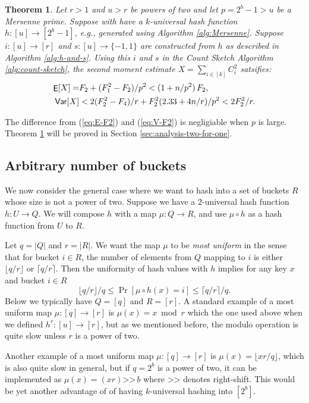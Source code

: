 \documentclass[12pt]{article}
\DeclareMathOperator*{\E}{\sf{E}}
\newcommand{\Var}{{\sf Var}}
\newcommand{\floor}[1]{\lfloor {#1} \rfloor}
\newcommand{\req}[1]{(\ref{#1})}
\newtheorem {theorem}[lemma] {Theorem}
\newcommand\fct\rightarrow
\newcommand\ceil[1]{\lceil {#1}\rceil}
\begin{document}
\begin{theorem}\label{thm:h-and-s-p}
Let $r>1$ and $u>r$ be powers of two and let $p=2^b-1>u$ be a
Mersenne prime.
Suppose with have a $k$-universal hash function $h:[u]\fct[2^b-1]$, e.g.,
generated using Algorithm \ref{alg:Mersenne}. Suppose
$i:[u]\fct[r]$ and
$s:[u]\fct\{-1,1\}$ are constructed from $h$ as described in
Algorithm \ref{alg:h-and-s}. Using this $i$ and $s$ 
in the Count Sketch Algorithm \ref{alg:count-sketch}, the second moment 
estimate $X=\sum_{i\in[k]} C_i^2$ satsifies:
\begin{align}
\E[X]=&F_2+(F_1^2-F_2)/p^2 < (1+n/p^2)\,F_2\textnormal,\label{eq:E-F2-p}\\
\Var[X]&< 2(F_2^2-F_4)/r+F_2^2 (2.33+4 n/r)/p^2<2F_2^2/r.\label{eq:V-F2-p}
\end{align}
\end{theorem}
The difference from \req{eq:E-F2} and \req{eq:V-F2} 
is negligiable when $p$ is large. Theorem \ref{thm:h-and-s-p} will be
proved in Section \ref{sec:analysis-two-for-one}.


\subsection{Arbitrary number of buckets}\label{sec:most-uniform}
We now consider the general case where we want to hash into a set of
buckets $R$ whose size is not a power of two. Suppose we have a
$2$-universal hash function $h:U\fct Q$. We will compose $h$ with a
map $\mu:Q\fct R$, and use $\mu\circ h$ as a hash function from
$U$ to $R$.

Let $q=|Q|$ and $r=|R|$. We want the map $\mu$ to be \emph{most
  uniform} in the sense that for bucket $i\in R$, the number of
elements from $Q$ mapping to $i$ is either $\floor{q/r}$ or
$\ceil{q/r}$. Then the uniformity of hash values with $h$ implies for
any key $x$ and bucket $i\in R$
\[\floor{q/r}/q\leq \Pr[\mu\circ
  h(x)=i]\leq \ceil{q/r}/q.\]
Below we typically have $Q=[q]$ and $R=[r]$. A standard example of a most uniform map $\mu:[q]\fct[r]$ 
is $\mu(x)=x\bmod r$ which the one used above when we defined 
$h^r:[u]\fct[r]$, but as we mentioned before, the modulo operation is 
quite slow unless $r$ is a power of two.

Another example of a most uniform map $\mu:[q]\fct[r]$ 
is $\mu(x)=\floor{xr/q}$,
which is also quite slow in general, but if $q=2^b$ is a power of two,
it can be implemented as $\mu(x)=(xr)\texttt{>>}\,b$ where 
$\texttt{>>}$ denotes right-shift. This would be yet another advantage 
of of having $k$-universal hashing into $[2^b]$.
\end{document}
